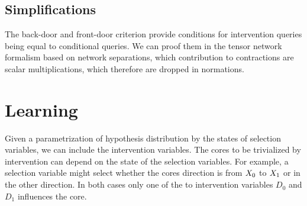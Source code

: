 \documentclass[aps,onecolumn,nofootinbib,pra]{article}
\newcommand{\dovariable}{D}
\newcommand{\dovariableof}[1]{\dovariable_{#1}}
\begin{document}
    \subsection{Simplifications}

    The back-door and front-door criterion provide conditions for intervention queries being equal to conditional queries.
    We can proof them in the tensor network formalism based on network separations, which contribution to contractions are scalar multiplications, which therefore are dropped in normations.


    \section{Learning}

    Given a parametrization of hypothesis distribution by the states of selection variables, we can include the intervention variables.
    The cores to be trivialized by intervention can depend on the state of the selection variables.
    For example, a selection variable might select whether the cores direction is from $X_{0}$ to $X_{1}$ or in the other direction.
    In both cases only one of the to intervention variables $\dovariableof{0}$ and $\dovariableof{1}$ influences the core.
\end{document}
